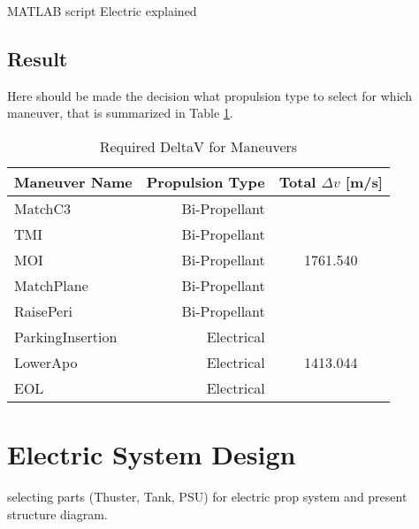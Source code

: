 MATLAB script Electric explained

\subsection{Result}
Here should be made the decision what propulsion type to select for which maneuver, that is summarized in Table \ref{tab:man-type}.



\begin{table}[htbp]
\centering
\caption{Required DeltaV for Maneuvers}
\label{tab:man-type}
\begin{tabular}{|l|r|c|} 
\hline
\multicolumn{1}{|c|}{\textbf{Maneuver Name}} & \multicolumn{1}{c|}{\textbf{ Propulsion Type}} & \textbf{Total $\Delta  v$ [m/s]}    \\ 
\hline
MatchC3                                      & Bi-Propellant                                  & \multirow{5}{*}{1761.540}  \\ 
\cline{1-2}
TMI                                          & Bi-Propellant                                  &                            \\ 
\cline{1-2}
MOI                                          & Bi-Propellant                                  &                            \\ 
\cline{1-2}
MatchPlane                                   & Bi-Propellant                                  &                            \\ 
\cline{1-2}
RaisePeri                                    & Bi-Propellant                                  &                            \\ 
\hline
ParkingInsertion                             & Electrical                                     & \multirow{3}{*}{1413.044}         \\ 
\cline{1-2}
LowerApo                                     & Electrical                                     &                                  \\ 
\cline{1-2}
EOL                                          & Electrical                                     &                                  \\
\hline
\end{tabular}
\end{table}


\section{Electric System Design}
selecting parts (Thuster, Tank, PSU) for electric prop system and present structure diagram.

